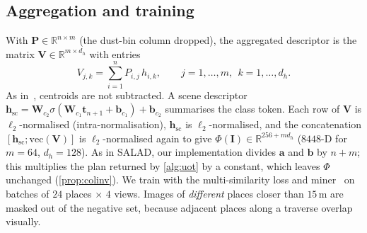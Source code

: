 \subsection{Aggregation and training}\label{sec:agg}
With $\mathbf{P}\in\mathbb{R}^{n\times m}$ (the dust-bin column dropped), the aggregated
descriptor is the matrix $\mathbf{V}\in\mathbb{R}^{m\times d_h}$ with entries
\begin{equation}
V_{j,k}=\sum_{i=1}^{n}P_{i,j}\,h_{i,k},\qquad j=1,\dots,m,\ \ k=1,\dots,d_h .
\label{eq:agg}
\end{equation}
As in~\cite{izquierdo2024optimal}, centroids are not subtracted. A scene descriptor
$\mathbf{h}_{\mathrm{sc}}=\mathbf{W}_{c_2}\sigma(\mathbf{W}_{c_1}\mathbf{t}_{n+1}+\mathbf{b}_{c_1})+\mathbf{b}_{c_2}$
summarises the class token. Each row of $\mathbf{V}$ is $\ell_2$-normalised (intra-normalisation),
$\mathbf{h}_{\mathrm{sc}}$ is $\ell_2$-normalised, and the concatenation
$[\mathbf{h}_{\mathrm{sc}};\mathrm{vec}(\mathbf{V})]$ is $\ell_2$-normalised again to give
$\Phi(\mathbf{I})\in\mathbb{R}^{256+m d_h}$ ($8448$-D for $m=64$, $d_h=128$). As in SALAD, our
implementation divides $\mathbf{a}$ and $\mathbf{b}$ by $n+m$; this multiplies the plan returned by
\cref{alg:uot} by a constant, which leaves $\Phi$ unchanged (\cref{prop:colinv}).
We train with the multi-similarity loss and miner~\cite{wang2019ms} on batches of $24$ places
$\times$ $4$ views. Images of \emph{different} places closer than $15$\,m are masked out of the
negative set, because adjacent places along a traverse overlap visually.

